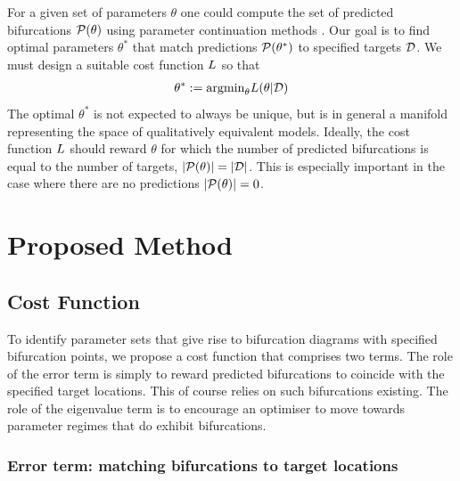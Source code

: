 \documentclass{article}
\begin{document}
For a given set of parameters $\theta$ one could compute the set of predicted bifurcations $\mathcal{P}(\theta)$ using parameter continuation methods \cite{Veltz2020BifurcationKit.jl,Farrell2016TheDiagrams}. Our goal is to find optimal parameters $\theta^*$ that match predictions $\mathcal{P}(\theta^*)$ to specified targets $\mathcal{D}$. We must design a suitable cost function $L$ so that
\begin{align}
    \theta^* := \mathrm{argmin}_{\theta} L(\theta|\mathcal{D})
    \label{eq:optimal-theta}
\end{align}
The optimal $\theta^*$ is not expected to always be unique, but is in general a manifold representing the space of qualitatively equivalent models. Ideally, the cost function $L$ should reward $\theta$ for which the number of predicted bifurcations is equal to the number of targets, $|\mathcal{P}(\theta)|=|\mathcal{D}|$. This is especially important in the case where there are no predictions $|\mathcal{P}(\theta)|=0$.

\section{Proposed Method}
\label{section:method}
\subsection{Cost Function}

To identify parameter sets that give rise to bifurcation diagrams with specified bifurcation points, we propose a cost function that comprises two terms. The role of the error term is simply to reward predicted bifurcations to coincide with the specified target locations. This of course relies on such bifurcations existing. The role of the eigenvalue term is to encourage an optimiser to move towards parameter regimes that do exhibit bifurcations.

\subsubsection{Error term: matching bifurcations to target locations}
\end{document}
